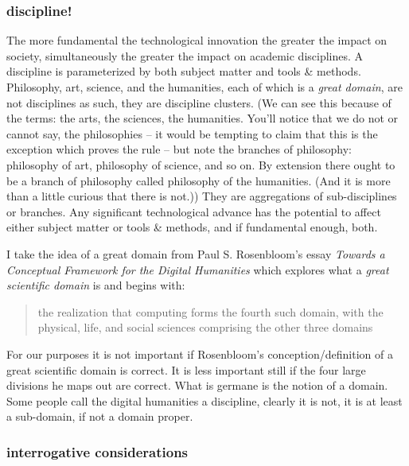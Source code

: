 \documentclass[dah,phd,a4paper]{xe_uccthesis}
\newcommand{\work}[1] {\textit{#1}}
\begin{document}
\subsubsection{discipline!}

The more fundamental the technological innovation the greater the impact on society, simultaneously the greater the impact on academic disciplines. A discipline is parameterized by both subject matter and tools \& methods. Philosophy, art, science, and the humanities, each of which is a \emph{great domain}, are not disciplines as such, they are discipline clusters. (We can see this because of the terms: the arts, the sciences, the humanities. You'll notice that we do not or cannot say, the philosophies -- it would be tempting to claim that this is the exception which proves the rule -- but note the branches of philosophy: philosophy of art, philosophy of science, and so on. By extension there ought to be a branch of philosophy called philosophy of the humanities. (And it is more than a little curious that there is not.)) They are aggregations of sub-disciplines or branches. Any significant technological advance has the potential to affect either subject matter or tools \& methods, and if fundamental enough, both.

I take the idea of a great domain from Paul S. Rosenbloom's essay \work{Towards a Conceptual Framework for the Digital Humanities} which explores what a \emph{great scientific domain} is and begins with:
\begin{quotation}
the realization that computing forms the fourth such domain, with the physical, life, and social sciences comprising the other three domains
\begin{flushright}
\citep{rosenbloom_towards_2012}
\end{flushright}
\end{quotation}
For our purposes it is not important if Rosenbloom's conception/definition of a great scientific domain is correct. It is less important still if the four large divisions he maps out are correct. What is germane is the notion of a domain. Some people call the digital humanities a discipline, clearly it is not, it is at least a sub-domain, if not a domain proper.

\subsubsection{interrogative considerations}
\end{document}
